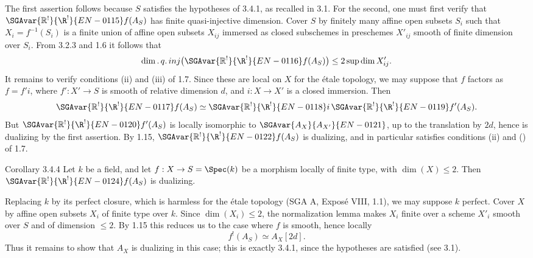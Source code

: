 \begin{prooftext}
The first assertion follows because $S$ satisfies the hypotheses of 3.4.1, as recalled in 3.1. For the second, one must first verify that $\SGAvar{\mathbb{R}^!}{\R^!}{EN-0115}f(A_S)$ has finite quasi-injective dimension. Cover $S$ by finitely many affine open subsets $S_i$ such that $X_i=f^{-1}(S_i)$ is a finite union of affine open subsets $X_{ij}$ immersed as closed subschemes in preschemes $X'_{ij}$ smooth of finite dimension over $S_i$. From 3.2.3 and 1.6 it follows that
\[
   \dim.\,q.\,inj\bigl(\SGAvar{\mathbb{R}^!}{\R^!}{EN-0116}f(A_S)\bigr)
       \le 2\sup \dim X'_{ij}.
\]
It remains to verify conditions (ii) and (iii) of 1.7. Since these are local on $X$ for the étale topology, we may suppose that $f$ factors as $f=f'i$, where $f':X'\to S$ is smooth of relative dimension $d$, and $i:X\to X'$ is a closed immersion. Then
\[
   \SGAvar{\mathbb{R}^!}{\R^!}{EN-0117}f(A_S)\simeq \SGAvar{\mathbb{R}^!}{\R^!}{EN-0118}i\,\SGAvar{\mathbb{R}^!}{\R^!}{EN-0119}f'(A_S).
\]
But $\SGAvar{\mathbb{R}^!}{\R^!}{EN-0120}f'(A_S)$ is locally isomorphic to $\SGAvar{A_{X}}{A_{X'}}{EN-0121}$, up to the translation by $2d$, hence is dualizing by the first assertion. By 1.15, $\SGAvar{\mathbb{R}^!}{\R^!}{EN-0122}f(A_S)$ is dualizing, and in particular satisfies conditions (ii) and () of 1.7. \qedtext
\end{prooftext}

\begin{statement}{Corollary 3.4.4}
Let $k$ be a field, and let $f:X\to S=\Spec(k)$ be a morphism locally of finite type, with $\dim(X)\le2$. Then $\SGAvar{\mathbb{R}^!}{\R^!}{EN-0124}f(A_S)$ is dualizing.
\end{statement}

\begin{prooftext}
Replacing $k$ by its perfect closure, which is harmless for the étale topology (SGA A, Exposé VIII, 1.1), we may suppose $k$ perfect. Cover $X$ by affine open subsets $X_i$ of finite type over $k$. Since $\dim(X_i)\le2$, the normalization lemma makes $X_i$ finite over a scheme $X'_i$ smooth over $S$ and of dimension $\le2$. By 1.15 this reduces us to the case where $f$ is smooth, hence locally
\[
   f^!(A_S)\simeq A_X[2d].
\]
Thus it remains to show that $A_X$ is dualizing in this case; this is exactly 3.4.1, since the hypotheses are satisfied (see 3.1). \qedtext
\end{prooftext}

